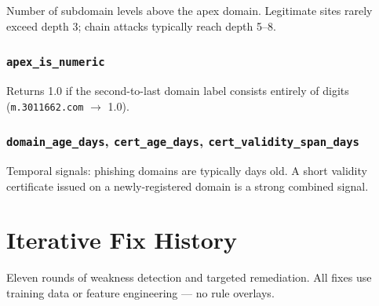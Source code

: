 \documentclass[11pt,a4paper]{article}
\newcommand{\code}[1]{\texttt{#1}}
\begin{document}
Number of subdomain levels above the apex domain. Legitimate sites
rarely exceed depth 3; chain attacks typically reach depth 5--8.

\subsubsection*{\code{apex\_is\_numeric}}

Returns 1.0 if the second-to-last domain label consists entirely of
digits (\code{m.3011662.com} $\rightarrow$ 1.0).

\subsubsection*{\code{domain\_age\_days}, \code{cert\_age\_days},
\code{cert\_validity\_span\_days}}

Temporal signals: phishing domains are typically days old. A short
validity certificate issued on a newly-registered domain is a strong
combined signal.

\section{Iterative Fix History}

Eleven rounds of weakness detection and targeted remediation. All
fixes use training data or feature engineering --- no rule overlays.
\end{document}
